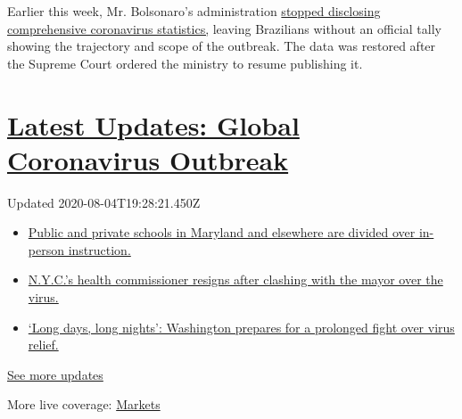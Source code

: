 Earlier this week, Mr. Bolsonaro's administration
\href{https://www.nytimes.com/2020/06/08/world/americas/brazil-coronavirus-statistics.html}{stopped
disclosing comprehensive coronavirus statistics,} leaving Brazilians
without an official tally showing the trajectory and scope of the
outbreak. The data was restored after the Supreme Court ordered the
ministry to resume publishing it.

\hypertarget{latest-updates-global-coronavirus-outbreak}{%
\section{\texorpdfstring{\href{https://www.nytimes.com/2020/08/04/world/coronavirus-cases.html?action=click\&pgtype=Article\&state=default\&region=MAIN_CONTENT_1\&context=storylines_live_updates}{Latest
Updates: Global Coronavirus
Outbreak}}{Latest Updates: Global Coronavirus Outbreak}}\label{latest-updates-global-coronavirus-outbreak}}

Updated 2020-08-04T19:28:21.450Z

\begin{itemize}
\tightlist
\item
  \href{https://www.nytimes.com/2020/08/04/world/coronavirus-cases.html?action=click\&pgtype=Article\&state=default\&region=MAIN_CONTENT_1\&context=storylines_live_updates\#link-4825b93}{Public
  and private schools in Maryland and elsewhere are divided over
  in-person instruction.}
\item
  \href{https://www.nytimes.com/2020/08/04/world/coronavirus-cases.html?action=click\&pgtype=Article\&state=default\&region=MAIN_CONTENT_1\&context=storylines_live_updates\#link-4d1eafa8}{N.Y.C.'s
  health commissioner resigns after clashing with the mayor over the
  virus.}
\item
  \href{https://www.nytimes.com/2020/08/04/world/coronavirus-cases.html?action=click\&pgtype=Article\&state=default\&region=MAIN_CONTENT_1\&context=storylines_live_updates\#link-6b644638}{`Long
  days, long nights': Washington prepares for a prolonged fight over
  virus relief.}
\end{itemize}

\href{https://www.nytimes.com/2020/08/04/world/coronavirus-cases.html?action=click\&pgtype=Article\&state=default\&region=MAIN_CONTENT_1\&context=storylines_live_updates}{See
more updates}

More live coverage:
\href{https://www.nytimes.com/live/2020/08/04/business/stock-market-today-coronavirus?action=click\&pgtype=Article\&state=default\&region=MAIN_CONTENT_1\&context=storylines_live_updates}{Markets}

